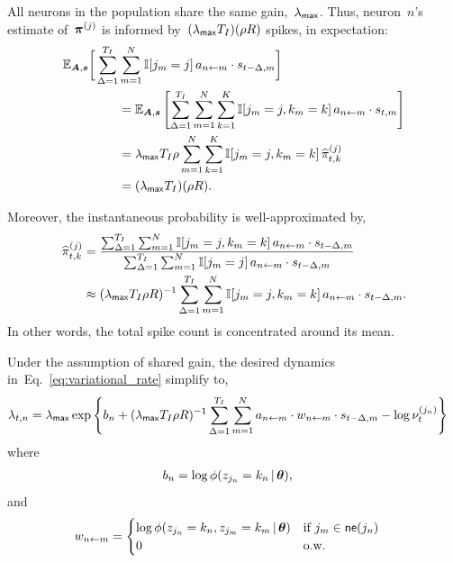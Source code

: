 \begin{assumption}
  All neurons in the population share the same gain,~$\lambda_{\mathsf{max}}$. 
  Thus, neuron~$n$'s estimate of~$\boldsymbol{\pi}^{(j)}$ is 
  informed by~$(\lambda_{\mathsf{max}} T_I)(\rho R)$ spikes, in expectation:
  \begin{align*}
    \mathbb{E}_{\boldsymbol{A},\boldsymbol{s}} \bigg[ \sum_{\Delta = 1}^{T_I} & \sum_{m=1}^N \mathbb{I}[j_m=j] \, a_{n \leftarrow m} \cdot s_{t-\Delta,m} \bigg] \\
    &= \mathbb{E}_{\boldsymbol{A},\boldsymbol{s}} \left[ \sum_{\Delta = 1}^{T_I} \sum_{m=1}^N \sum_{k=1}^K \mathbb{I}[j_m=j, k_m=k] \, a_{n \leftarrow m} \cdot s_{t,m} \right] \\
    &= \lambda_{\mathsf{max}} T_I \rho \sum_{m=1}^N \sum_{k=1}^K \mathbb{I}[j_m=j, k_m=k] \, \widehat{\pi}_{t,k}^{(j)} \\
    &= (\lambda_{\mathsf{max}} T_I) (\rho R).
  \end{align*}

  Moreover, the instantaneous probability is well-approximated by,
  \begin{align*}
      \widehat{\pi}_{t,k}^{(j)} &=
  \frac{\sum_{\Delta=1}^{T_I} \sum_{m=1}^N \mathbb{I}[j_m=j, k_m=k] \, a_{n \leftarrow m} \cdot s_{t-\Delta, m}}
       {\sum_{\Delta=1}^{T_I} \sum_{m=1}^N \mathbb{I}[j_m=j] \, a_{n \leftarrow m} \cdot s_{t-\Delta, m}} \\
       &\approx (\lambda_{\mathsf{max}} T_I \rho R)^{-1} \sum_{\Delta=1}^{T_I} \sum_{m=1}^N \mathbb{I}[j_m=j, k_m=k] \, a_{n \leftarrow m} \cdot s_{t-\Delta, m}.
  \end{align*}
  In other words, the total spike count is concentrated around its mean.
\end{assumption}

Under the assumption of shared gain, the
desired dynamics in~Eq.~\ref{eq:variational_rate}
simplify to,
\begin{align}
  \label{eq:mf_log_probs}
  \lambda_{t,n} &= \lambda_{\mathsf{max}}
  \exp \left \{b_n + (\lambda_{\mathsf{max}} T_I \rho R)^{-1} \sum_{\Delta=1}^{T_I} \sum_{m=1}^N a_{n \leftarrow m} \cdot w_{n \leftarrow m} \cdot s_{t-\Delta,m}
  - \log \nu_t^{(j_n)} \right \}
\end{align}
where
\begin{align*}
  b_n &= \log \phi(z_{j_n} = k_n \,|\, \boldsymbol{\theta}),
\end{align*}
and
\begin{align*}
  w_{n \leftarrow m} &=
  \begin{cases}
    \log \phi(z_{j_n}=k_n, z_{j_m}=k_m \,|\, \boldsymbol{\theta}) & \text{if }j_m
    \in \mathsf{ne}(j_n) \\
    0 & \text{o.w.}
  \end{cases}
\end{align*}

